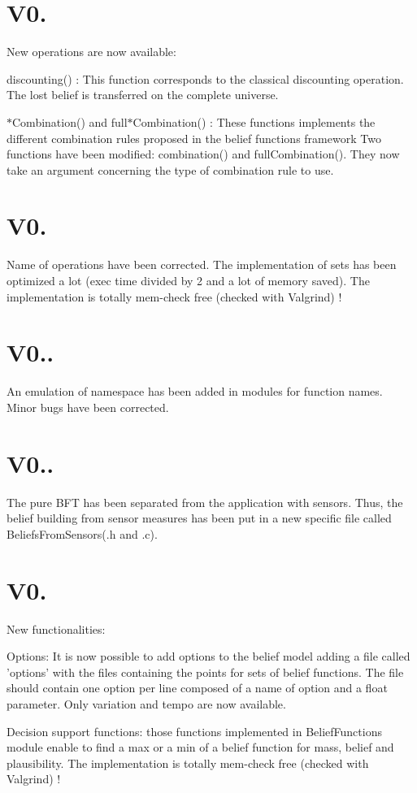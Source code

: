 \hypertarget{version_sec_v02_subsec}{}\section{V0.}\label{version_sec_v02_subsec}
New operations are now available\-: \begin{DoxyItemize}
\item discounting() \-: This function corresponds to the classical discounting operation. The lost belief is transferred on the complete universe. \item $\ast$\-Combination() and full$\ast$\-Combination() \-: These functions implements the different combination rules proposed in the belief functions framework Two functions have been modified\-: combination() and full\-Combination(). They now take an argument concerning the type of combination rule to use.\end{DoxyItemize}
\hypertarget{version_sec_v03_subsec}{}\section{V0.}\label{version_sec_v03_subsec}
Name of operations have been corrected. The implementation of sets has been optimized a lot (exec time divided by 2 and a lot of memory saved). The implementation is totally mem-\/check free (checked with Valgrind) !\hypertarget{version_sec_v03_1_subsec}{}\section{V0..}\label{version_sec_v03_1_subsec}
An emulation of namespace has been added in modules for function names. Minor bugs have been corrected.\hypertarget{version_sec_v03_2_subsec}{}\section{V0..}\label{version_sec_v03_2_subsec}
The pure B\-F\-T has been separated from the application with sensors. Thus, the belief building from sensor measures has been put in a new specific file called Beliefs\-From\-Sensors(.h and .c).\hypertarget{version_sec_v04_subsec}{}\section{V0.}\label{version_sec_v04_subsec}
New functionalities\-: \begin{DoxyItemize}
\item Options\-: It is now possible to add options to the belief model adding a file called 'options' with the files containing the points for sets of belief functions. The file should contain one option per line composed of a name of option and a float parameter. Only variation and tempo are now available. \item Decision support functions\-: those functions implemented in Belief\-Functions module enable to find a max or a min of a belief function for mass, belief and plausibility. The implementation is totally mem-\/check free (checked with Valgrind) !\end{DoxyItemize}
